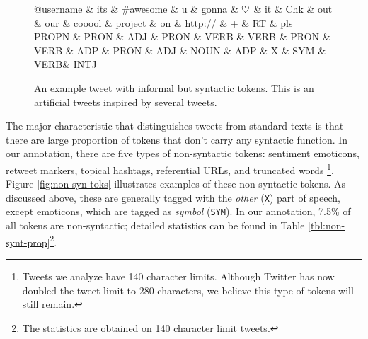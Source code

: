 \documentclass[11pt,a4paper]{article}
\newcommand{\heart}{\ensuremath\heartsuit}
\begin{document}
\begin{figure}[t]
	\centering
	\small
	\begin{dependency}[edge slant=2, text only label, label style=above]
		\begin{deptext}
			@username \& its \& \#awesome \& u \& gonna \& $\heart$ \& it \& Chk \& out \& our \& cooool \& project \& on \& http:// \& + \& RT \& pls\\
			\tiny PROPN \& \tiny PRON \& \tiny ADJ \& \tiny PRON \& \tiny VERB \& \tiny VERB \& \tiny PRON \& \tiny VERB \& \tiny ADP \& \tiny PRON \& \tiny ADJ \& \tiny NOUN \& \tiny ADP \& \tiny X \& \tiny SYM \& \tiny VERB\& \tiny INTJ\\
		\end{deptext}
	\end{dependency}
	\caption{An example tweet with informal but syntactic tokens.
		This is an artificial tweets inspired by several tweets.}\label{fig:informal-toks}
\end{figure}

The major characteristic that distinguishes tweets from standard texts is that
there are large proportion of tokens that don't carry any syntactic function.
In our annotation, there are five types of non-syntactic tokens: 
sentiment emoticons, retweet markers, topical hashtags, referential URLs, and
truncated words \footnote{Tweets we analyze have 140 character limits. Although Twitter has now doubled the tweet limit to 280 characters, we believe this type of tokens will still remain.}. Figure \ref{fig:non-syn-toks} illustrates examples of
these non-syntactic tokens.  As discussed above, these are generally
tagged with the \emph{other} (\texttt{X}) part of speech, except
emoticons, which are tagged as \emph{symbol} (\texttt{SYM}).  In our annotation, 
7.5\% of all tokens are non-syntactic; detailed statistics can be found in Table \ref{tbl:non-synt-prop}\footnote{The statistics are obtained on 140 character limit tweets.}.
\end{document}
